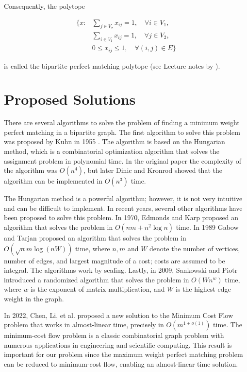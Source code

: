 Consequently, the polytope

\begin{equation}
    \begin{aligned}
        \{ x: & \sum_{j \in V_2} x_{ij} = 1, \quad \forall i \in V_1, \\
        & \sum_{i \in V_1} x_{ij} = 1, \quad \forall j \in V_2, \\
        & 0 \leq x_{ij} \leq 1, \quad \forall (i, j) \in E \}
    \end{aligned}
\end{equation}

is called the bipartite perfect matching polytope (see Lecture notes by \cite{goemans2009matching}). 

\section{Proposed Solutions} \label{sec:mwpbm_solutions}
There are several algorithms to solve the problem of finding a minimum weight perfect matching in a bipartite graph. The first algorithm to solve this problem was proposed by Kuhn in 1955 \cite{kuhn1955hungarian}. The algorithm is based on the Hungarian method, which is a combinatorial optimization algorithm that solves the assignment problem in polynomial time. In the original paper the complexity of the algorithm was $O(n^4)$, but later Dinic and Kronrod \cite{dinic1969algorithm} showed that the algorithm can be implemented in $O(n^3)$ time.

The Hungarian method is a powerful algorithm; however, it is not very intuitive and can be difficult to implement. In recent years, several other algorithms have been proposed to solve this problem. In 1970, Edmonds and Karp \cite{edmonds1972theoretical} proposed an algorithm that solves the problem in $O(nm + n^2 \log n)$ time. In 1989 Gabow and Tarjan \cite{gabow1989faster} proposed an algorithm that solves the problem in $O(\sqrt{n}m \log(nW))$ time,  where $n,m$ and $W$ denote the number of vertices, number of edges, and largest magnitude of a cost; costs are assumed to be integral. The algorithms work by scaling. Lastly, in 2009, Sankowski and Piotr \cite{sankowski2009maximum} introduced a randomized algorithm that solves the problem in $O(Wn^w)$ time, where $w$ is the exponent of matrix multiplication, and $W$ is the highest edge weight in the graph.

In 2022, Chen, Li, et al. \cite{chen2022maximum} proposed a new solution to the 
Minimum Cost Flow problem that works in almost-linear time, precisely in 
$O(m^{1+o(1)})$ time. The minimum-cost flow problem is a classic combinatorial 
graph problem with numerous applications in engineering and scientific computing. 
This result is important for our problem since the maximum weight perfect 
matching problem can be reduced to minimum-cost flow, enabling an almost-linear 
time solution.

